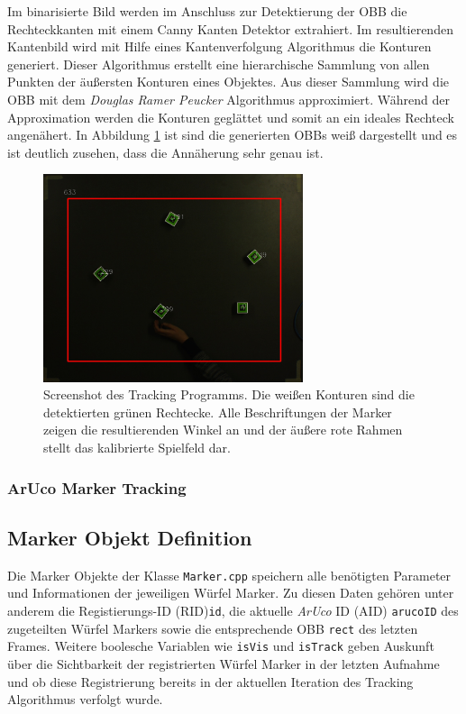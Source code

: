 Im binarisierte Bild werden im Anschluss zur Detektierung der OBB die Rechteckkanten mit einem Canny Kanten Detektor extrahiert. Im resultierenden Kantenbild wird mit Hilfe eines Kantenverfolgung Algorithmus \cite{article:FindConturs} die Konturen generiert. Dieser Algorithmus erstellt eine hierarchische Sammlung von allen Punkten der äußersten Konturen eines Objektes. Aus dieser Sammlung wird die OBB mit dem \textit{Douglas Ramer Peucker} Algorithmus \cite{article:RamerPeucker} approximiert. Während der Approximation werden die Konturen geglättet und somit an ein ideales Rechteck angenähert. In Abbildung \ref{fig:DebugScreenshot} ist sind die generierten OBBs weiß dargestellt und es ist deutlich zusehen, dass die Annäherung sehr genau ist.
\begin{figure}[H]
	\centering
	\includegraphics[width=3in]{Bilder/TrackingScreenshot_x.jpg}
	\caption{Screenshot des Tracking Programms. Die weißen Konturen sind die detektierten grünen Rechtecke. Alle Beschriftungen der Marker zeigen die resultierenden Winkel an und der äußere rote Rahmen stellt das kalibrierte Spielfeld dar.}
	\label{fig:DebugScreenshot}
\end{figure}
\subsubsection{ArUco Marker Tracking}\label{sec:ArucoMarkerTracking}

\subsection{Marker Objekt Definition}
Die Marker Objekte der Klasse \texttt{Marker.cpp} speichern alle benötigten Parameter und Informationen der jeweiligen Würfel Marker. Zu diesen Daten gehören unter anderem die Registierungs-ID (RID)\texttt{id}, die aktuelle \textit{ArUco} ID (AID) \texttt{arucoID} des zugeteilten Würfel Markers sowie die entsprechende OBB \texttt{rect} des letzten Frames. Weitere boolesche Variablen wie \texttt{isVis} und \texttt{isTrack} geben Auskunft über die Sichtbarkeit der registrierten Würfel Marker in der letzten Aufnahme und ob diese Registrierung bereits in der aktuellen Iteration des Tracking Algorithmus verfolgt wurde.

